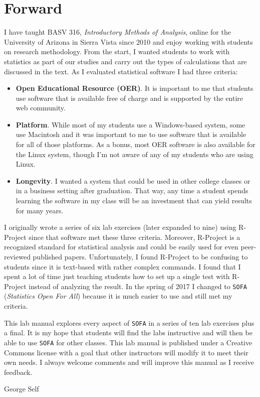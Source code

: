 \chapter*{Forward}\label{for:forward}

I have taught BASV 316, \textit{Introductory Methods of Analysis}, online for the University of Arizona in Sierra Vista since 2010 and enjoy working with students on research methodology. From the start, I wanted students to work with statistics as part of our studies and carry out the types of calculations that are discussed in the text. As I evaluated statistical software I had three criteria:

\begin{itemize}
  \item \textbf{Open Educational Resource (OER)}. It is important to me that students use software that is available free of charge and is supported by the entire web community. 
  \item \textbf{Platform}. While most of my students use a Windows-based system, some use Macintosh and it was important to me to use software that is available for all of those platforms. As a bonus, most OER software is also available for the Linux system, though I'm not aware of any of my students who are using Linux.
  \item \textbf{Longevity}. I wanted a system that could be used in other college classes or in a business setting after graduation. That way, any time a student spends learning the software in my class will be an investment that can yield results for many years.
\end{itemize}

I originally wrote a series of six lab exercises (later expanded to nine) using R-Project since that software met these three criteria. Moreover, R-Project is a recognized standard for statistical analysis and could be easily used for even peer-reviewed published papers. Unfortunately, I found R-Project to be confusing to students since it is text-based with rather complex commands. I found that I spent a lot of time just teaching students how to set up a single test with R-Project instead of analyzing the result. In the spring of 2017 I changed to \texttt{SOFA} (\textit{Statistics Open For All}) because it is much easier to use and still met my criteria.

This lab manual explores every aspect of \texttt{SOFA} in a series of ten lab exercises plus a final. It is my hope that students will find the labs instructive and will then be able to use \texttt{SOFA} for other classes. This lab manual is published under a Creative Commons license with a goal that other instructors will modify it to meet their own needs. I always welcome comments and will improve this manual as I receive feedback.

\bigskip
\begin{flushright}
  \textemdash  George Self
\end{flushright}


